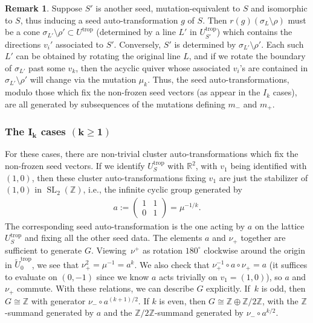 \documentclass[pdftex]{sigma}
\numberwithin{equation}{section}
\numberwithin{figure}{section}
\numberwithin{table}{section}
\DeclareMathOperator{\SL}{SL}
\DeclareMathOperator{\trop}{trop}
\let\bb=\mathbb
\let\wt=\widetilde
\theoremstyle{definition}
\newtheorem{rmk}[thm]{Remark}
\begin{document}
\begin{rmk}\label{subseq}Suppose $S'$ is another seed, mutation-equivalent to $S$ and isomorphic to $S$, thus inducing a seed auto-transformation $g$ of $S$. Then $r(g)(\sigma_{L}\setminus \rho)$ must be a cone $\sigma_{L'}\setminus \rho'\subset U^{\trop}$ (determined by a line $L'$ in $U_{S'}^{\trop}$) which contains the directions $v_i'$ associated to $S'$. Conversely, $S'$ is determined by $\sigma_{L'}\setminus \rho'$. Each such $L'$ can be obtained by rotating the original line $L$, and if we rotate the boundary of $\sigma_{L'}$ past some $v_k$, then the acyclic quiver whose associated $v_i$'s are contained in $\sigma_{L'}\setminus \rho'$ will change via the mutation $\mu_k$. Thus, the seed auto-transformations, modulo those which fix the non-frozen seed vectors (as appear in the $I_k$ cases), are all generated by subsequences of the mutations defining $m_-$ and $m_+$.
\end{rmk}

\subsubsection[The $I_k$ cases $(k\geq 1)$]{The $\boldsymbol{I_k}$ cases $\boldsymbol{(k\geq 1)}$}
For these cases, there are non-trivial cluster auto-transformations which fix the non-frozen seed vectors. If we identify $U^{\trop}_S$ with $\bb{R}^2$, with $v_1$ being identified with $(1,0)$, then these cluster auto-transformations fixing $v_1$ are just the stabilizer of $(1,0)$ in $\SL_2(\bb{Z})$, i.e., the infinite cyclic group generated by
\begin{align*}
a:=\left(\begin{matrix} 1 & 1 \\ 0 & 1 \end{matrix} \right)=\mu^{-1/k}.
\end{align*}
The corresponding seed auto-transformation is the one acting by $a$ on the lattice $U^{\trop}_S$ and fixing all the other seed data. The elements $a$ and $\nu_+$ together are sufficient to generate $G$. Viewing~$\nu^+$ as rotation $180^{\circ}$ clockwise around the origin in $\wt{U}_0^{\trop}$, we see that $\nu_+^2 = \mu^{-1}=a^k$. We also check that $\nu_+^{-1}\circ a \circ \nu_+=a$ (it suffices to evaluate on $(0,-1)$ since we know $a$ acts trivially on $v_1=(1,0)$), so $a$ and $\nu_+$ commute. With these relations, we can describe $G$ explicitly. If~$k$ is odd, then $G\cong \bb{Z}$ with generator $\nu_-\circ a^{(k+1)/2}$. If $k$ is even, then $G\cong \bb{Z}\oplus \bb{Z}/2\bb{Z}$, with the $\bb{Z}$-summand generated by $a$ and the $\bb{Z}/2\bb{Z}$-summand generated by $\nu_-\circ a^{k/2}$.
\end{document}
